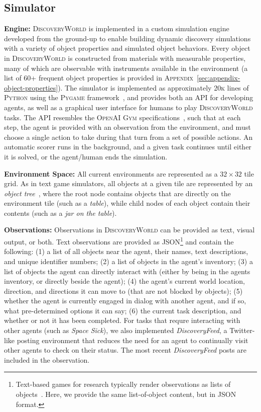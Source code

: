 \documentclass{article}
\newcommand{\env}{\textsc{DiscoveryWorld}\xspace}
\begin{document}
\subsection{Simulator}
\textbf{Engine:} \env is implemented in a custom simulation engine developed from the ground-up to enable building dynamic discovery simulations with a variety of object properties and simulated object behaviors.  Every object in \env is constructed from materials with measurable properties, many of which are observable with instruments available in the environment (a list of 60+ frequent object properties is provided in \textsc{Appendix}~\ref{sec:appendix-object-properties}).  The simulator is implemented as approximately \textsc{20k} lines of \textsc{Python} using the \textsc{Pygame} framework~\citep{pygame}, and provides both an \textsc{API} for developing agents, as well as a graphical user interface for humans to play \env tasks.  The \textsc{API} resembles the \textsc{OpenAI Gym} specifications~\citep{brockman2016openai,towers_gymnasium_2023}, such that at each step, the agent is provided with an observation from the environment, and must choose a single action to take during that turn from a set of possible actions.  An automatic scorer runs in the background, and a given task continues until either it is solved, or the agent/human ends the simulation. 

\textbf{Environment Space:} All current environments are represented as a $32\times32$ tile grid.  As in text game simulators, all objects at a given tile are represented by an \textit{object tree}~\citep{learningZIL1989}, where the root node contains objects that are directly on the environment tile (such as a \textit{table}), while child nodes of each object contain their contents (such as a \textit{jar on the table}). %

\textbf{Observations:} Observations in \env can be provided as text, visual output, or both.  Text observations are provided as \textsc{JSON}\footnote{Text-based games for research typically render observations as lists of objects~\citep{Ct2018TextWorldAL,wang2022scienceworld}. Here, we provide the same list-of-object content, but in \textsc{JSON} format.} and contain the following: (1) a list of all objects near the agent, their names, text descriptions, and unique identifier numbers; (2) a list of objects in the agent's inventory; (3) a list of objects the agent can directly interact with (either by being in the agents inventory, or directly beside the agent); (4) the agent's current world location, direction, and directions it can move to (that are not blocked by objects); (5) whether the agent is currently engaged in dialog with another agent, and if so, what pre-determined options it can say; (6) the current task description, and whether or not it has been completed.  For tasks that requre interacting with other agents (such as \textit{Space Sick}), we also implemented \textit{DiscoveryFeed}, a Twitter-like posting environment that reduces the need for an agent to continually visit other agents to check on their status.  The most recent \textit{DiscoveryFeed} posts are included in the observation. %
\end{document}
